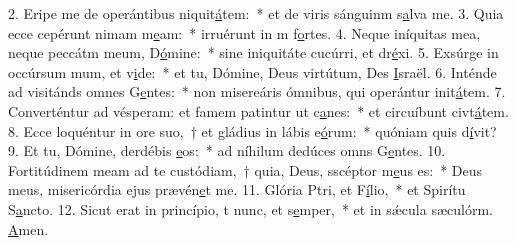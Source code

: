 2. Eripe me de operántibus niquit\uline{á}tem:~* et de viris sánguinm s\uline{a}lva me.
3. Quia ecce cepérunt nimam m\uline{e}am:~* irruérunt in m f\uline{o}rtes.
4. Neque iníquitas mea, neque peccátm meum, D\uline{ó}mine:~* sine iniquitáte cucúrri, et dr\uline{é}xi.
5. Exsúrge in occúrsum mum, et v\uline{i}de:~* et tu, Dómine, Deus virtútum, Des \uline{I}sraël.
6. Inténde ad visitánds omnes G\uline{e}ntes:~* non misereáris ómnibus, qui operántur init\uline{á}tem.
7. Converténtur ad vésperam: et famem patintur ut c\uline{a}nes:~* et circuíbunt civt\uline{á}tem.
8. Ecce loquéntur in ore suo,~† et gládius in lábis e\uline{ó}rum:~* quóniam quis d\uline{í}vit?
9. Et tu, Dómine, derdébis \uline{e}os:~* ad níhilum dedúces omns G\uline{e}ntes.
10. Fortitúdinem meam ad te custódiam,~† quia, Deus, sscéptor m\uline{e}us es:~* Deus meus, misericórdia ejus prævén\uline{e}t me.
11. Glória Ptri, et F\uline{í}lio,~* et Spirítu S\uline{a}ncto.
12. Sicut erat in princípio, t nunc, et s\uline{e}mper,~* et in sǽcula sæculórm. \uline{A}men.
